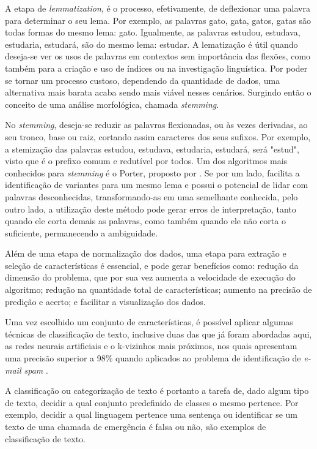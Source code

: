 A etapa de \textit{lemmatization}, é o processo, efetivamente, de deflexionar uma palavra para determinar o seu lema. Por exemplo, as palavras gato, gata, gatos, gatas são todas formas do mesmo lema: gato. Igualmente, as palavras estudou, estudava, estudaria, estudará, são do mesmo lema: estudar. A lematização é útil quando deseja-se ver os usos de palavras em contextos sem importância das flexões, como também para a criação e uso de índices ou na investigação linguística. Por poder se tornar um processo custoso, dependendo da quantidade de dados, uma alternativa mais barata acaba sendo mais viável nesses cenários. Surgindo então o conceito de uma análise morfológica, chamada \textit{stemming}.

No \textit{stemming}, deseja-se reduzir as palavras flexionadas, ou às vezes derivadas, ao seu tronco, base ou raiz, cortando assim caracteres dos seus sufixos. Por exemplo, a stemização das palavras estudou, estudava, estudaria, estudará, será "estud", visto que é o prefixo comum e redutível por todos. Um dos algoritmos mais conhecidos para \textit{stemming} é o Porter, proposto por \citep{porter1980algorithm}. Se por um lado, facilita a identificação de variantes para um mesmo lema e possui o potencial de lidar com palavras desconhecidas, transformando-as em uma semelhante conhecida, pelo outro lado, a utilização deste método pode gerar erros de interpretação, tanto quando ele corta demais as palavras, como também quando ele não corta o suficiente, permanecendo a ambiguidade.

Além de uma etapa de normalização dos dados, uma etapa para extração e seleção de características é essencial, e pode gerar benefícios como: redução da dimensão do problema, que por sua vez aumenta a velocidade de execução do algoritmo; redução na quantidade total de características; aumento na precisão de predição e acerto; e facilitar a visualização dos dados.

Uma vez escolhido um conjunto de características, é possível aplicar algumas técnicas de classificação de texto, inclusive duas das que já foram abordadas aqui, as redes neurais artificiais e o k-vizinhos mais próximos, nos quais apresentam uma precisão superior a 98\% quando aplicados ao problema de identificação de \textit{e-mail spam} \citep{russell1994inteligencia}.

A classificação ou categorização de texto é portanto a tarefa de, dado algum tipo de texto, decidir a qual conjunto predefinido de classes o mesmo pertence. Por exemplo, decidir a qual linguagem pertence uma sentença ou identificar se um texto de uma chamada de emergência é falsa ou não, são exemplos de classificação de texto.
